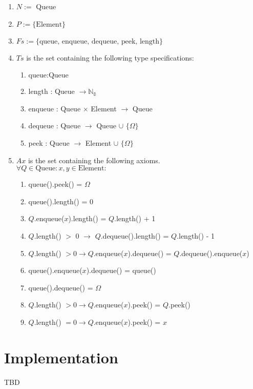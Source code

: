\documentclass{article}
\begin{document}
\begin{enumerate}
 \item \(N :=\) Queue
 \item \(P := \{ \text{Element} \}\)
 \item \(Fs := \{ \text{queue, enqueue, dequeue, peek, length} \}\)
 \item \(Ts\) is the set containing the following type specifications:
	\begin{enumerate}
		\item \( \text{queue} : \text{Queue} \)
  		\item length : Queue \(\rightarrow \mathbb{N_0}\)
		\item enqueue : Queue \(\times\) Element \(\rightarrow\) Queue
		\item dequeue : Queue \(\rightarrow\) Queue \(\cup\) \(\{\Omega\}\)
		\item peek : Queue \(\rightarrow\) Element \(\cup\) \(\{\Omega\}\)
	\end{enumerate}
 \item \(Ax\) is the set containing the following axioms. \\
	\(\forall Q \in \text{Queue} : x,y \in \text{Element} :\)
	\begin{enumerate}
  \item queue().peek() = \(\Omega\)
  \item queue().length() = 0
  \item \(Q\).enqueue(\(x\)).length() = \(Q\).length() + 1
  \item \(Q\).length() \(>\) 0 \(\rightarrow\) \(Q\).dequeue().length() = \(Q\).length() - 1
  \item \(Q\).length() \(> 0 \rightarrow Q\).enqueue(\(x\)).dequeue() = \(Q\).dequeue().enqueue(\(x\))
  \item queue().enqueue(\(x\)).dequeue() = queue()
  \item queue().dequeue() = \(\Omega\)
  \item \(Q\).length() \(> 0 \rightarrow Q\).enqueue(\(x\)).peek() = \(Q\).peek()
  \item \(Q\).length() \(= 0 \rightarrow Q\).enqueue(\(x\)).peek() = \(x\)
	\end{enumerate}
\end{enumerate}


\section*{Implementation}
TBD
\end{document}
